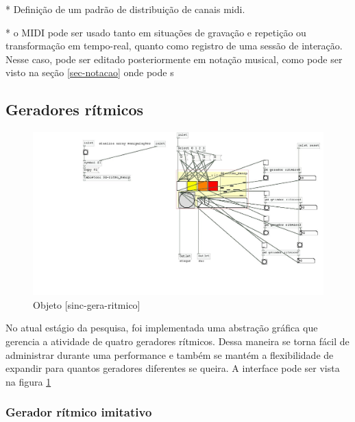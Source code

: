 \documentclass{ppgmus}
\begin{document}
* Definição de um padrão de distribuição de canais midi.

* o MIDI pode ser usado tanto em situações de gravação e repetição ou
transformação em tempo-real, quanto como registro de uma sessão de interação.
Nesse caso, pode ser editado posteriormente em notação musical, como pode ser
visto na seção \ref{sec-notacao} onde pode s


\subsection{Geradores rítmicos}






\begin{figure}[!ht]
\includegraphics[scale=.5]{sinc-gera-ritmo}
\caption{Objeto [sinc-gera-ritmico]}
\label{[sinc-gera-ritmico]}
\end{figure}

No atual estágio da pesquisa, foi implementada uma abstração gráfica
que gerencia a atividade de quatro geradores rítmicos. Dessa
maneira se torna fácil de administrar durante uma performance
e também se mantém a flexibilidade de expandir para quantos
geradores diferentes se queira. A interface pode ser vista na figura \ref{[sinc-gera-ritmico]}


\subsubsection{Gerador rítmico imitativo}
\end{document}
